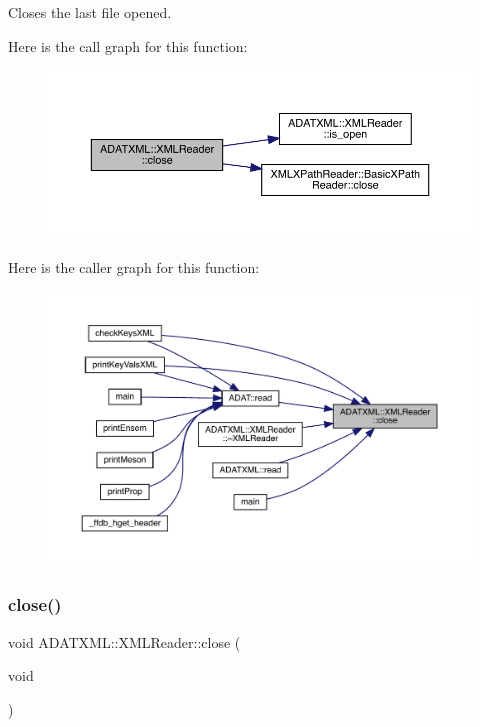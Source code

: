 Closes the last file opened. 

Here is the call graph for this function\+:
\nopagebreak
\begin{figure}[H]
\begin{center}
\leavevmode
\includegraphics[width=350pt]{db/d3f/classADATXML_1_1XMLReader_a0e5f84d85bb03e1ba3c01a20b1642a36_cgraph}
\end{center}
\end{figure}
Here is the caller graph for this function\+:\nopagebreak
\begin{figure}[H]
\begin{center}
\leavevmode
\includegraphics[width=350pt]{db/d3f/classADATXML_1_1XMLReader_a0e5f84d85bb03e1ba3c01a20b1642a36_icgraph}
\end{center}
\end{figure}
\mbox{\label{classADATXML_1_1XMLReader_a0e5f84d85bb03e1ba3c01a20b1642a36}} 
\subsubsection{\texorpdfstring{close()}{close()}\hspace{0.1cm}{\footnotesize\ttfamily [2/2]}}
{\footnotesize\ttfamily void A\+D\+A\+T\+X\+M\+L\+::\+X\+M\+L\+Reader\+::close (\begin{DoxyParamCaption}\item[{void}]{ }\end{DoxyParamCaption})\hspace{0.3cm}{\ttfamily [inline]}}



